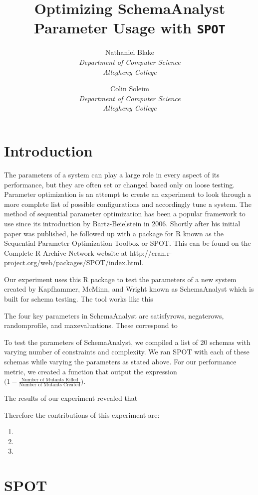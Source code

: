 \documentclass[a4paper,twocolumn]{article}
\title{Optimizing SchemaAnalyst Parameter Usage with \texttt{SPOT}}
\author{Nathaniel Blake \\ \textit{Department of Computer Science} \\ \textit{Allegheny College} \and Colin Soleim \\ \textit{Department of Computer Science} \\ \textit{Allegheny College}}
\date{}
\begin{document}
\maketitle

\section{Introduction}

The parameters of a system can play a large role in every aspect of its performance, but they are often set or changed based only on loose testing. Parameter optimization is an attempt to create an experiment to look through a more complete list of possible configurations and accordingly tune a system. The method of sequential parameter optimization has been a popular framework to use since its introduction by Bartz-Beielstein in 2006. Shortly after his initial paper was published, he followed up with a package for R known as the Sequential Parameter Optimization Toolbox or SPOT. This can be found on the Complete R Archive Network website at http://cran.r-project.org/web/packages/SPOT/index.html. 

Our experiment uses this R package to test the parameters of a new system created by Kapfhammer, McMinn, and Wright known as SchemaAnalyst which is built for schema testing. The tool works like this

The four key parameters in SchemaAnalyst are satisfyrows, negaterows, randomprofile, and maxevaluations. These correspond to 

To test the parameters of SchemaAnalyst, we compiled a list of 20 schemas with varying number of constraints and complexity. We ran SPOT with each of these schemas while varying the parameters as stated above. For our performance metric, we created a function that output the expression $ \big( 1 - \frac{\text{Number of Mutants Killed}}{\text{Number of Mutants Created}} \big). $

The results of our experiment revealed that 

Therefore the contributions of this experiment are:

\begin{enumerate}
\item
\item
\item
\end{enumerate}

\section{SPOT} \label{sec:SPOT}
\end{document}
